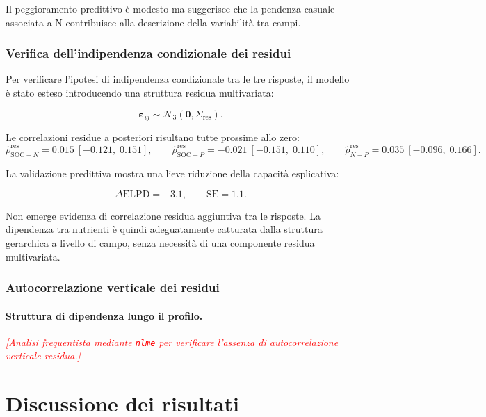 \documentclass[11pt, a4paper]{article}
\newcommand{\CI}[2]{[#1,\;#2]}
\newcommand{\todo}[1]{\textcolor{red}{\textit{[#1]}}}
\begin{document}
Il peggioramento predittivo è modesto ma suggerisce che la pendenza
casuale associata a N contribuisce alla descrizione della variabilità
tra campi.

\subsubsection{Verifica dell'indipendenza condizionale dei residui}

Per verificare l'ipotesi di indipendenza condizionale tra le tre risposte, il modello è stato esteso introducendo una struttura residua multivariata:

\[
\boldsymbol{\varepsilon}_{ij}
\sim
\mathcal{N}_{3}
\!\left(
\mathbf{0},
\Sigma_{\mathrm{res}}
\right).
\]

Le correlazioni residue a posteriori risultano tutte prossime allo zero:
\[
\hat{\rho}^{\mathrm{res}}_{\mathrm{SOC}-N} = 0.015\ \CI{-0.121}{0.151},
\qquad
\hat{\rho}^{\mathrm{res}}_{\mathrm{SOC}-P} = -0.021\ \CI{-0.151}{0.110},
\qquad
\hat{\rho}^{\mathrm{res}}_{N-P} = 0.035\ \CI{-0.096}{0.166}.
\]

La validazione predittiva mostra una lieve riduzione della capacità esplicativa:

\[
\Delta\mathrm{ELPD}
=
-3.1,
\qquad
\mathrm{SE}=1.1.
\]

Non emerge evidenza di correlazione residua aggiuntiva tra le risposte. La dipendenza tra nutrienti è quindi adeguatamente catturata dalla struttura gerarchica a livello di campo, senza necessità di una componente residua multivariata.

\subsubsection{Autocorrelazione verticale dei residui}

\paragraph{Struttura di dipendenza lungo il profilo.}

\todo{Analisi frequentista mediante \texttt{nlme} per verificare l'assenza di autocorrelazione verticale residua.}


\section{Discussione dei risultati}
\end{document}

